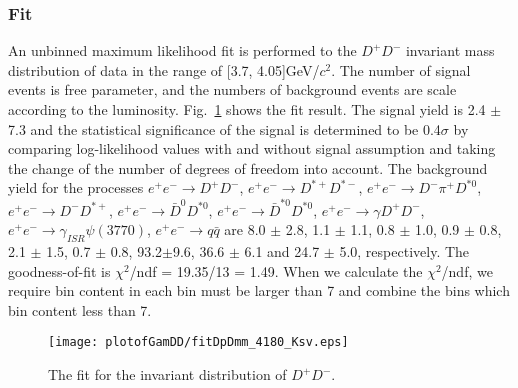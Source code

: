 \documentclass[aps,preprint,tightenlines,superscriptaddress,showpacs,byrevtex,amsmath,amssymb,nofloatfix]{revtex4}
\begin{document}
\subsubsection{Fit}
An unbinned maximum likelihood fit is performed to the $D^{+}D^{-}$  invariant mass distribution of data in the range of [3.7, 4.05]GeV/$c^{2}$. The number of signal events is free parameter, and the numbers of background events are scale according to the luminosity. Fig.~\ref{fitmDDbar_Dp_4180} shows the fit result. The signal yield is 2.4 $\pm$ 7.3 and the statistical significance of the signal is determined to be 0.4$\sigma$ by comparing log-likelihood values with and without signal assumption and taking the change of the number of degrees of freedom into account. The background yield for the processes $e^{+}e^{-}\rightarrow D^{+}D^{-}$, $e^{+}e^{-}\rightarrow D^{*+}D^{*-}$, $e^{+}e^{-}\rightarrow D^{-}\pi^{+}D^{*0}$, $e^{+}e^{-}\rightarrow D^{-}D^{*+}$, $e^{+}e^{-}\rightarrow \bar{D}^{0}D^{*0}$, $e^{+}e^{-}\rightarrow \bar{D}^{*0}D^{*0}$, $e^{+}e^{-}\rightarrow \gamma D^{+}D^{-}$, $e^{+}e^{-}\rightarrow \gamma_{ISR} \psi(3770)$, $e^{+}e^{-}\rightarrow q\bar{q}$ are 8.0 $\pm$ 2.8, 1.1 $\pm$ 1.1, 0.8 $\pm$ 1.0, 0.9 $\pm$ 0.8, 2.1 $\pm$ 1.5, 0.7 $\pm$ 0.8, 93.2$\pm$9.6, 36.6 $\pm$ 6.1 and 24.7 $\pm$ 5.0, respectively. The goodness-of-fit is $\chi^{2}$/ndf = 19.35/13 = 1.49. When we calculate the $\chi^{2}$/ndf, we require bin content in each bin must be larger than 7 and combine the bins which bin content less than 7.

\begin{figure}[!htbp]
  \captionsetup{justification=raggedright}
    \texttt{[image: plotofGamDD/fitDpDmm\_4180\_Ksv.eps]}

  \caption{\small The fit for the invariant distribution of $D^{+}D^{-}$.}
  \label{fitmDDbar_Dp_4180}
\end{figure}
\end{document}
